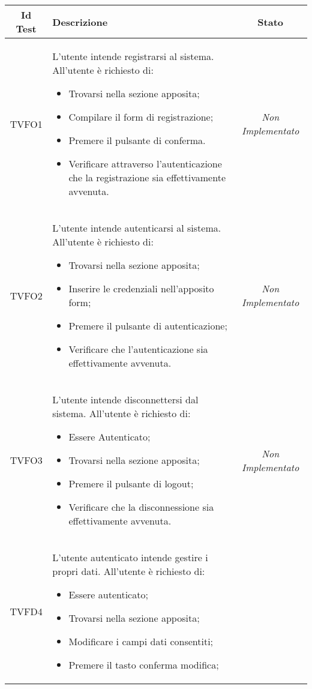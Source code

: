 \normalsize
\begin{longtable}[ht]{|c|>{}m{8cm}|c|}
\hline 
\textbf{Id Test} & \textbf{Descrizione} & \textbf{Stato}\\
\hline
\endhead
\hypertarget{TVFO1}{TVFO1} & L’utente intende registrarsi al sistema. All’utente è richiesto di:
\begin{itemize}
\item
Trovarsi nella sezione apposita;
\item
Compilare il form di registrazione;
\item
Premere il pulsante di conferma.
\item
Verificare attraverso l’autenticazione che la registrazione sia effettivamente avvenuta.
\end{itemize}
 & \textit{Non Implementato}\\ \hline
\hypertarget{TVFO2}{TVFO2} & L’utente intende autenticarsi al sistema. All’utente è richiesto di:
\begin{itemize}
\item
Trovarsi nella sezione apposita;
\item
Inserire le credenziali nell’apposito form;
\item
Premere il pulsante di autenticazione;
\item
Verificare che l’autenticazione sia effettivamente avvenuta.
\end{itemize}
 & \textit{Non Implementato}\\ \hline
\hypertarget{TVFO3}{TVFO3} & L’utente intende disconnettersi dal sistema. All’utente è richiesto di:
\begin{itemize}
\item
Essere Autenticato;
\item
Trovarsi nella sezione apposita;
\item
Premere il pulsante di logout;
\item
Verificare che la disconnessione sia effettivamente avvenuta. 
\end{itemize}
& \textit{Non Implementato}\\ \hline
\hypertarget{TVFD4}{TVFD4} & L’utente autenticato  intende gestire i propri dati. All’utente è richiesto di:
\begin{itemize}
\item
Essere autenticato;
\item
Trovarsi nella sezione apposita;
\item
Modificare i campi dati consentiti;
\item
Premere il tasto conferma modifica;

\end{itemize}
\end{longtable}
